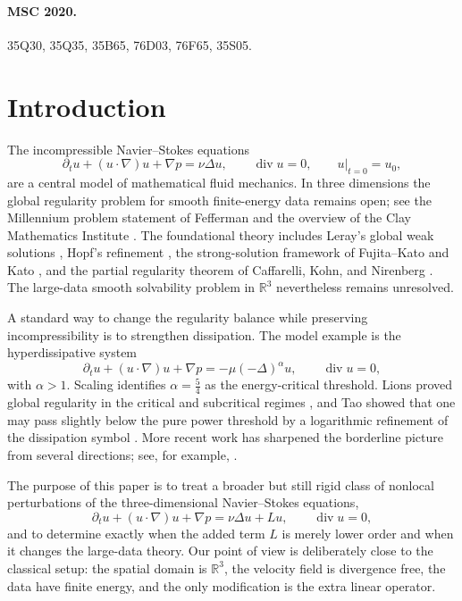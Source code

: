 \documentclass[11pt]{article}
\theoremstyle{definition}
\theoremstyle{remark}
\newcommand{\R}{\mathbb{R}}
\newcommand{\diver}{\operatorname{div}}
\begin{document}
\paragraph{MSC 2020.} 35Q30, 35Q35, 35B65, 76D03, 76F65, 35S05.

\section{Introduction}

The incompressible Navier--Stokes equations
\begin{equation}\label{eq:NS-classical}
\partial_t u + (u\cdot\nabla)u + \nabla p = \nu \Delta u,
\qquad \diver u = 0,
\qquad u|_{t=0}=u_0,
\end{equation}
are a central model of mathematical fluid mechanics. In three dimensions the global regularity problem for smooth finite-energy data remains open; see the Millennium problem statement of Fefferman and the overview of the Clay Mathematics Institute \cite{Fefferman2006,ClayNS}. The foundational theory includes Leray's global weak solutions \cite{Leray1934}, Hopf's refinement \cite{Hopf1951}, the strong-solution framework of Fujita--Kato and Kato \cite{FujitaKato1964,Kato1984}, and the partial regularity theorem of Caffarelli, Kohn, and Nirenberg \cite{CaffarelliKohnNirenberg1982}. The large-data smooth solvability problem in $\R^3$ nevertheless remains unresolved.

A standard way to change the regularity balance while preserving incompressibility is to strengthen dissipation. The model example is the hyperdissipative system
\begin{equation}\label{eq:NS-hd}
\partial_t u + (u\cdot\nabla)u + \nabla p = -\mu(-\Delta)^\alpha u,
\qquad \diver u = 0,
\end{equation}
with $\alpha>1$. Scaling identifies $\alpha=\frac54$ as the energy-critical threshold. Lions proved global regularity in the critical and subcritical regimes \cite{Lions1969}, and Tao showed that one may pass slightly below the pure power threshold by a logarithmic refinement of the dissipation symbol \cite{Tao2009}. More recent work has sharpened the borderline picture from several directions; see, for example, \cite{GrujicXu2024,GrujicXu2025,LiQuZengZhang2024,ChenJiangYuan2025}.

The purpose of this paper is to treat a broader but still rigid class of nonlocal perturbations of the three-dimensional Navier--Stokes equations,
\begin{equation}\label{eq:modified-NS-intro}
\partial_t u + (u\cdot\nabla)u + \nabla p = \nu \Delta u + Lu,
\qquad \diver u = 0,
\end{equation}
and to determine exactly when the added term $L$ is merely lower order and when it changes the large-data theory. Our point of view is deliberately close to the classical setup: the spatial domain is $\R^3$, the velocity field is divergence free, the data have finite energy, and the only modification is the extra linear operator.
\end{document}

